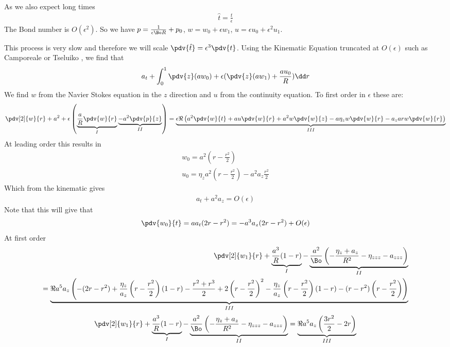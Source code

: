 \documentclass[12pt]{article}
\begin{document}
As we also expect long times
\begin{align}
\hat t = \frac{t}{\epsilon}
\end{align}
The Bond number is $O(\epsilon^2)$. So we have $p = \frac{1}{\epsilon \Bo R} + p_0$, $w = w_0 + \epsilon w_1$, $u = \epsilon u_0 + \epsilon^2 u_1$. 

This process is very slow and therefore we will scale $\pdv{\hat t} = \epsilon^3\pdv{t}$. Using the Kinematic Equation truncated at $O(\epsilon)$ such as Camporeale \cite{camporeale_2017} or Tseluiko \cite{tseluiko_blyth_papageorgiou_2013}, we find that 
\begin{align}
a_t  +\int_0^1{\pdv{z}(aw_0) +\epsilon( \pdv{z}(aw_1)+\frac{a u_0}{R} )\dd r} \label{intform}
\end{align}
We find $w$ from the Navier Stokes equation in the $z$ direction and $u$ from the continuity equation. To first order in $\epsilon$ these are:
\begin{align}
\pdv[2]{w}{r} + a^2 +\epsilon\left(\underbrace{\frac{a}{R}\pdv{w}{r}}_{I} \underbrace{-a^2\pdv{p}{z}}_{II}\right) =\underbrace{\epsilon\Re\left(a^2\pdv{w}{t}+a u\pdv{w}{r}+ a^2w\pdv{w}{z}-a\eta_zw\pdv{w}{r}-a_z a r w\pdv{w}{r}\right)}_{III}
\end{align}
At leading order this results in
\begin{align}
w_0 = a^2\left(r-\frac{r^2}{2}\right)\label{w0}\\
u_0 = \eta_z a^2\left(r-\frac{r^2}{2}\right) - a^2a_z\frac{r^2}{2} \label{u0}
\end{align}
Which from the kinematic gives
\begin{align}
a_t + a^2a_z = O(\epsilon) 
\end{align}
Note that this will give that
\begin{align}
\pdv{w_0}{t} = aa_t(2r- r^2) = - a^3a_z(2r-r^2) +O(\epsilon)
\end{align}
At first order
\begin{align}
\pdv[2]{w_1}{r} + \underbrace{\frac{a^3}{R}(1-r)}_I -\underbrace{\frac{a^2}{\Bo}\left(-\frac{\eta_z + a_z}{R^2}-\eta_{zzz} - a_{zzz}\right)}_{II}\\ = \underbrace{\Re a^5 a_z\left(-(2r-r^2)+\frac{\eta_z}{a_z}\left(r-\frac{r^2}{2}\right)(1-r)-\frac{r^2 + r^3}{2}+ 2\left(r-\frac{r^2}{2}\right)^2-\frac{\eta_z}{a_z}\left(r-\frac{r^2}{2}\right)(1-r)- (r-r^2)\left(r-\frac{r^2}{2}\right)\right)}_{III}
\end{align}
\begin{align}
\pdv[2]{w_1}{r} + \underbrace{\frac{a^3}{R}(1-r)}_I -\underbrace{\frac{a^2}{\Bo}\left(-\frac{\eta_z + a_z}{R^2}-\eta_{zzz} - a_{zzz}\right)}_{II} = \underbrace{\Re a^5 a_z\left(\frac{3r^2}{2}-2r\right)}_{III}
\end{align}
\end{document}
